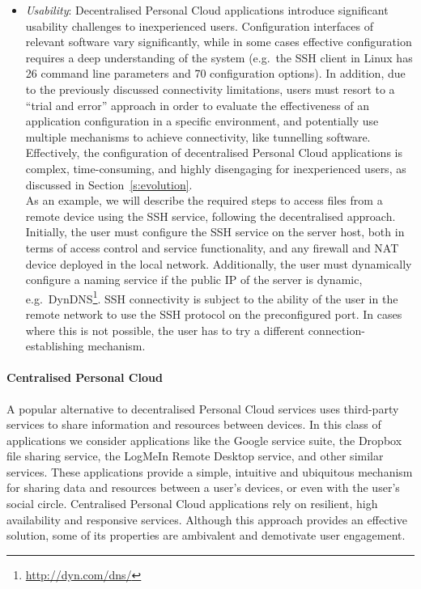 \begin{itemize}
  \item {\it Usability}\/: Decentralised Personal Cloud applications introduce
    significant usability challenges to inexperienced users. Configuration
    interfaces of relevant software vary significantly, while in some cases
    effective configuration requires a deep understanding of the system (e.g.~the
    SSH client in Linux has 26 command line parameters and 70 configuration
    options).  In addition, due to the previously discussed connectivity
    limitations, users must resort to a ``trial and error'' approach in order to
    evaluate the effectiveness of an application configuration in a specific
    environment, and potentially use multiple mechanisms to achieve
    connectivity, like tunnelling software.  Effectively, the configuration of
    decentralised Personal Cloud applications is complex, time-consuming, and
    highly disengaging for inexperienced users, as discussed in
    Section~\ref{s:evolution}.\\ 
    As an example, we will describe the required steps to access files from a remote
    device using the SSH service, following the decentralised approach. Initially,
    the user must configure the SSH service on the server host, both in terms of
    access control and service functionality, and any firewall and NAT device
    deployed in the local network. Additionally, the user must dynamically configure
    a naming service if the public IP of the server is dynamic,
    e.g.~DynDNS\footnote{\url{http://dyn.com/dns/}}\@.  SSH connectivity is
    subject to the ability of the user in the remote network to use the SSH
    protocol on the preconfigured port.  In cases where this is not possible, the
    user has to try a different connection-establishing mechanism.
\end{itemize}

\paragraph*{Centralised Personal Cloud}

A popular alternative to decentralised Personal Cloud services uses third-party
services to share information and resources between devices.  In this class of
applications we consider applications like the Google service suite, the Dropbox
file sharing service, the LogMeIn Remote Desktop service, and other similar
services.  These applications provide a simple, intuitive and ubiquitous
mechanism for sharing data and resources between a user's devices, or even with
the user's social circle.  Centralised Personal Cloud applications rely on resilient,
high availability and responsive services.  Although this approach provides an
effective solution, some of its properties are ambivalent and demotivate user
engagement. 


